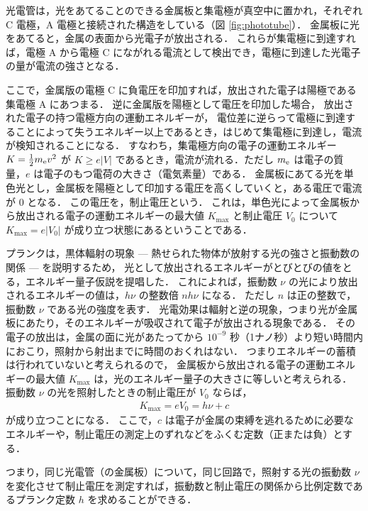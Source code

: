 \documentclass[11pt,sort]{jarticle}
\begin{document}
光電管は，光をあてることのできる金属板と集電極が真空中に置かれ，それぞれ C 電極，A 電極と接続された構造をしている（図 \ref{fig:phototube}）．
金属板に光をあてると，金属の表面から光電子が放出される．
これらが集電極に到達すれば，電極 A から電極 C にながれる電流として検出でき，電極に到達した光電子の量が電流の強さとなる．

ここで，金属版の電極 C に負電圧を印加すれば，放出された電子は陽極である集電極 A にあつまる．
逆に金属版を陽極として電圧を印加した場合，
放出された電子の持つ電極方向の運動エネルギーが，
電位差に逆らって電極に到達することによって失うエネルギー以上であるとき，はじめて集電極に到達し，電流が検知されることになる．
すなわち，集電極方向の電子の運動エネルギー $K = \frac{1}{2}m_{\rm e} v^2$ が $K \geq e |V|$ であるとき，電流が流れる．ただし $m_{\rm e}$ は電子の質量，$e$ は電子のもつ電荷の大きさ（電気素量）である．
金属板にあてる光を単色光とし，金属板を陽極として印加する電圧を高くしていくと，ある電圧で電流が 0 となる．
この電圧を，制止電圧という．
これは，単色光によって金属板から放出される電子の運動エネルギーの最大値 $K_{\max}$ と制止電圧 $V_0$ について $K_{\max} = e |V_0|$ が成り立つ状態にあるということである．

プランクは，黒体輻射の現象 --- 
熱せられた物体が放射する光の強さと振動数の関係 --- を説明するため，
光として放出されるエネルギーがとびとびの値をとる，エネルギー量子仮説を提唱した．
これによれば，振動数 $\nu$ の光により放出されるエネルギーの値は，$h \nu$ の整数倍 $n h \nu$ になる．
ただし $n$ は正の整数で，振動数 $\nu$ である光の強度を表す．
光電効果は輻射と逆の現象，つまり光が金属板にあたり，そのエネルギーが吸収されて電子が放出される現象である．
その電子の放出は，金属の面に光があたってから $10^{-9}$ 秒（1ナノ秒）より短い時間内におこり，照射から射出までに時間のおくれはない\cite{Arya-book-1974}．
つまりエネルギーの蓄積は行われていないと考えられるので，
金属板から放出される電子の運動エネルギーの最大値 $K_{\max}$ は，光のエネルギー量子の大きさに等しいと考えられる．
振動数 $\nu$ の光を照射したときの制止電圧が $V_0$ ならば，
\begin{eqnarray}\label{eq:1}
K_{\max} = e V_0 = h \nu + c
\end{eqnarray}
が成り立つことになる．
ここで，$c$ は電子が金属の束縛を逃れるために必要なエネルギーや，制止電圧の測定上のずれなどをふくむ定数（正または負）とする．

つまり，同じ光電管（の金属板）について，同じ回路で，照射する光の振動数 $\nu$ を変化させて制止電圧を測定すれば，振動数と制止電圧の関係から比例定数であるプランク定数 $h$ を求めることができる．
\end{document}
